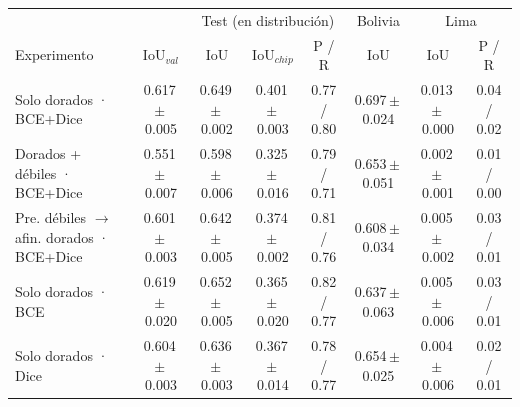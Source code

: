 \begin{tabular}{lcccc|c|cc}
\toprule
 & & \multicolumn{3}{c|}{Test (en distribución)} & Bolivia & \multicolumn{2}{c}{Lima} \\
Experimento & IoU$_{val}$ & IoU & IoU$_{chip}$ & P / R & IoU & IoU & P / R \\
\midrule
Solo dorados · BCE+Dice & 0.617\,$\pm$\,0.005 & 0.649\,$\pm$\,0.002 & 0.401\,$\pm$\,0.003 & 0.77 / 0.80 & 0.697\,$\pm$\,0.024 & 0.013\,$\pm$\,0.000 & 0.04 / 0.02 \\
Dorados + débiles · BCE+Dice & 0.551\,$\pm$\,0.007 & 0.598\,$\pm$\,0.006 & 0.325\,$\pm$\,0.016 & 0.79 / 0.71 & 0.653\,$\pm$\,0.051 & 0.002\,$\pm$\,0.001 & 0.01 / 0.00 \\
Pre. débiles $\to$ afin. dorados · BCE+Dice & 0.601\,$\pm$\,0.003 & 0.642\,$\pm$\,0.005 & 0.374\,$\pm$\,0.002 & 0.81 / 0.76 & 0.608\,$\pm$\,0.034 & 0.005\,$\pm$\,0.002 & 0.03 / 0.01 \\
\midrule
Solo dorados · BCE & 0.619\,$\pm$\,0.020 & 0.652\,$\pm$\,0.005 & 0.365\,$\pm$\,0.020 & 0.82 / 0.77 & 0.637\,$\pm$\,0.063 & 0.005\,$\pm$\,0.006 & 0.03 / 0.01 \\
Solo dorados · Dice & 0.604\,$\pm$\,0.003 & 0.636\,$\pm$\,0.003 & 0.367\,$\pm$\,0.014 & 0.78 / 0.77 & 0.654\,$\pm$\,0.025 & 0.004\,$\pm$\,0.006 & 0.02 / 0.01 \\
\bottomrule
\end{tabular}

